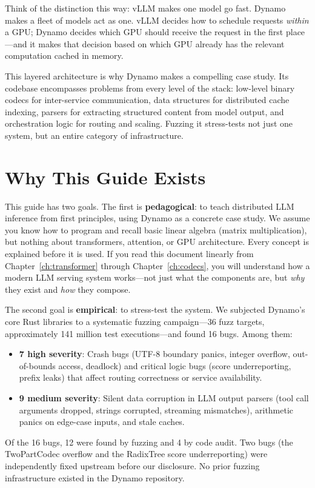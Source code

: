 \begin{insightbox}
Think of the distinction this way: vLLM makes one model go fast. Dynamo makes a fleet of models act as one. vLLM decides how to schedule requests \emph{within} a GPU; Dynamo decides which GPU should receive the request in the first place---and it makes that decision based on which GPU already has the relevant computation cached in memory.
\end{insightbox}

This layered architecture is why Dynamo makes a compelling case study. Its codebase encompasses problems from every level of the stack: low-level binary codecs for inter-service communication, data structures for distributed cache indexing, parsers for extracting structured content from model output, and orchestration logic for routing and scaling. Fuzzing it stress-tests not just one system, but an entire category of infrastructure.

\section{Why This Guide Exists}

This guide has two goals. The first is \textbf{pedagogical}: to teach distributed LLM inference from first principles, using Dynamo as a concrete case study. We assume you know how to program and recall basic linear algebra (matrix multiplication), but nothing about transformers, attention, or GPU architecture. Every concept is explained before it is used. If you read this document linearly from Chapter~\ref{ch:transformer} through Chapter~\ref{ch:codecs}, you will understand how a modern LLM serving system works---not just what the components are, but \emph{why} they exist and \emph{how} they compose.

The second goal is \textbf{empirical}: to stress-test the system. We subjected Dynamo's core Rust libraries to a systematic fuzzing campaign---36 fuzz targets, approximately 141 million test executions---and found 16 bugs. Among them:
\begin{itemize}
  \item \textbf{7 high severity}: Crash bugs (UTF-8 boundary panics, integer overflow, out-of-bounds access, deadlock) and critical logic bugs (score underreporting, prefix leaks) that affect routing correctness or service availability.
  \item \textbf{9 medium severity}: Silent data corruption in LLM output parsers (tool call arguments dropped, strings corrupted, streaming mismatches), arithmetic panics on edge-case inputs, and stale caches.
\end{itemize}
Of the 16 bugs, 12 were found by fuzzing and 4 by code audit. Two bugs (the TwoPartCodec overflow and the RadixTree score underreporting) were independently fixed upstream before our disclosure. No prior fuzzing infrastructure existed in the Dynamo repository.

